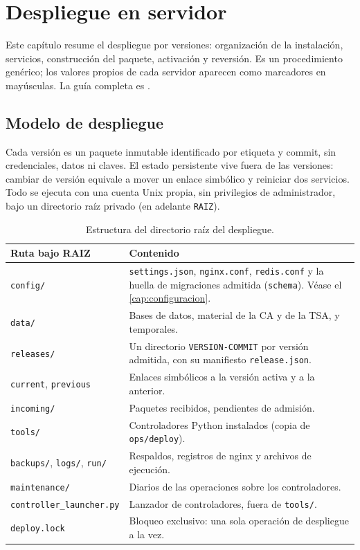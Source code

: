 \chapter{Despliegue en servidor}\label{cap:despliegue}

Este capítulo resume el despliegue por versiones: organización de la
instalación, servicios, construcción del paquete, activación y reversión. Es
un procedimiento genérico; los valores propios de cada servidor aparecen
como marcadores en mayúsculas. La guía completa es
.

\section{Modelo de despliegue}\label{sec:desp-modelo}

Cada versión es un paquete inmutable identificado por etiqueta y commit,
sin credenciales, datos ni claves. El estado persistente vive fuera de las
versiones: cambiar de versión equivale a mover un enlace simbólico y
reiniciar dos servicios. Todo se ejecuta con una cuenta Unix propia, sin
privilegios de administrador, bajo un directorio raíz privado (en adelante
\texttt{RAIZ}).

\begin{table}[H]
  \centering
  \caption{Estructura del directorio raíz del despliegue.}\label{tab:desp-raiz}
  \begin{tabularx}{\textwidth}{L{5.1cm} Y}
    \toprule
    \textbf{Ruta bajo RAIZ} & \textbf{Contenido} \\
    \midrule
    \texttt{config/}
      & \texttt{settings.json}, \texttt{nginx.conf}, \texttt{redis.conf} y
        la huella de migraciones admitida (\texttt{schema}). Véase el
        \cref{cap:configuracion}. \\
    \texttt{data/}
      & Bases de datos, material de la CA y de la TSA, y temporales. \\
    \texttt{releases/}
      & Un directorio \texttt{VERSION-COMMIT} por versión admitida, con su
        manifiesto \texttt{release.json}. \\
    \texttt{current}, \texttt{previous}
      & Enlaces simbólicos a la versión activa y a la anterior. \\
    \texttt{incoming/}
      & Paquetes recibidos, pendientes de admisión. \\
    \texttt{tools/}
      & Controladores Python instalados (copia de \texttt{ops/deploy}). \\
    \texttt{backups/}, \texttt{logs/}, \texttt{run/}
      & Respaldos, registros de nginx y archivos de ejecución. \\
    \texttt{maintenance/}
      & Diarios de las operaciones sobre los controladores. \\
    \texttt{controller\_launcher.py}
      & Lanzador de controladores, fuera de \texttt{tools/}. \\
    \texttt{deploy.lock}
      & Bloqueo exclusivo: una sola operación de despliegue a la vez. \\
    \bottomrule
  \end{tabularx}
\end{table}

